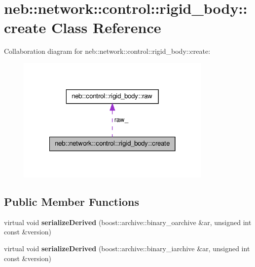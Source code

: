 \hypertarget{classneb_1_1network_1_1control_1_1rigid__body_1_1create}{\section{neb\-:\-:network\-:\-:control\-:\-:rigid\-\_\-body\-:\-:create \-Class \-Reference}
\label{classneb_1_1network_1_1control_1_1rigid__body_1_1create}
}


\-Collaboration diagram for neb\-:\-:network\-:\-:control\-:\-:rigid\-\_\-body\-:\-:create\-:\nopagebreak
\begin{figure}[H]
\begin{center}
\leavevmode
\includegraphics[width=270pt]{classneb_1_1network_1_1control_1_1rigid__body_1_1create__coll__graph}
\end{center}
\end{figure}
\subsection*{\-Public \-Member \-Functions}
\begin{DoxyCompactItemize}
\item 
\hypertarget{classneb_1_1network_1_1control_1_1rigid__body_1_1create_a5f205b71765901305b8400d97e1258cf}{virtual void {\bfseries serialize\-Derived} (boost\-::archive\-::binary\-\_\-oarchive \&ar, unsigned int const \&version)}\label{classneb_1_1network_1_1control_1_1rigid__body_1_1create_a5f205b71765901305b8400d97e1258cf}

\item 
\hypertarget{classneb_1_1network_1_1control_1_1rigid__body_1_1create_accdf097402c5b47877670285f9070976}{virtual void {\bfseries serialize\-Derived} (boost\-::archive\-::binary\-\_\-iarchive \&ar, unsigned int const \&version)}\label{classneb_1_1network_1_1control_1_1rigid__body_1_1create_accdf097402c5b47877670285f9070976}

\end{DoxyCompactItemize}
